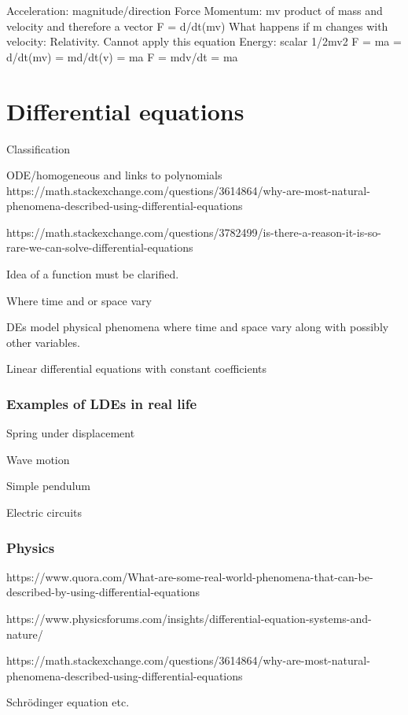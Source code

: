 \documentclass[
  a4paper,
]{article}
\begin{document}
Acceleration: magnitude/direction Force Momentum: mv product of mass and
velocity and therefore a vector F = d/dt(mv) What happens if m changes
with velocity: Relativity. Cannot apply this equation Energy: scalar
1/2mv2 F = ma = d/dt(mv) = md/dt(v) = ma F = mdv/dt = ma

\section{Differential equations}\label{differential-equations}

Classification

ODE/homogeneous and links to polynomials
https://math.stackexchange.com/questions/3614864/why-are-most-natural-phenomena-described-using-differential-equations

https://math.stackexchange.com/questions/3782499/is-there-a-reason-it-is-so-rare-we-can-solve-differential-equations

Idea of a function must be clarified.

Where time and or space vary

DEs model physical phenomena where time and space vary along with
possibly other variables.

Linear differential equations with constant coefficients

\subsubsection{Examples of LDEs in real
life}\label{examples-of-ldes-in-real-life}

Spring under displacement

Wave motion

Simple pendulum

Electric circuits

\subsubsection{Physics}\label{physics}

https://www.quora.com/What-are-some-real-world-phenomena-that-can-be-described-by-using-differential-equations

https://www.physicsforums.com/insights/differential-equation-systems-and-nature/

https://math.stackexchange.com/questions/3614864/why-are-most-natural-phenomena-described-using-differential-equations

Schrödinger equation etc.
\end{document}
